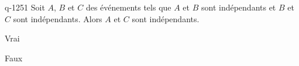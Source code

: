 \begin{truefalse}{q-1251}
Soit $A$, $B$ et $C$ des événements tels que $A$ et $B$ sont indépendants et $B$ et $C$ sont indépendants. Alors $A$ et $C$ sont indépendants.
\item Vrai
\item* Faux
\end{truefalse}

